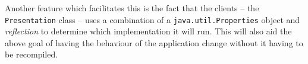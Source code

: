 Another feature which facilitates this is the fact that the clients -- the
\texttt{Presentation} class -- uses a combination of a
\texttt{java.util.Properties} object and \emph{reflection} to determine which
implementation it will run. This will also aid the above goal of having the
behaviour of the application change without it having to be recompiled.
